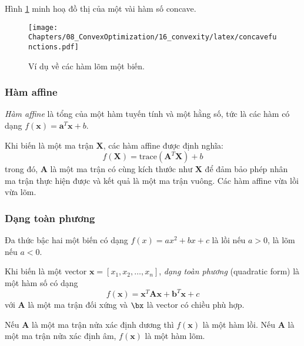 Hình \ref{fig:16_concavefunctions} minh hoạ đồ thị của một vài hàm số concave.

\begin{figure}[t]
\centering
    \texttt{[image: Chapters/08\_ConvexOptimization/16\_convexity/latex/concavefunctions.pdf]}
    \caption[]{Ví dụ về các hàm lõm một biến.}
    \label{fig:16_concavefunctions}
    \captionsetup[figure]{format=rule, justification=centering}
\end{figure}
 
\subsubsection{Hàm affine}
\textit{Hàm affine} là tổng của một hàm tuyến tính và một hằng số, tức là các hàm có dạng $f(\mathbf{x}) = \mathbf{a}^T\mathbf{x} + b $. 
 
Khi biến là một ma trận $\mathbf{X}$, các hàm affine được định nghĩa: 
\begin{equation*} 
f(\mathbf{X}) = \text{trace}(\mathbf{A}^T\mathbf{X}) + b 
\end{equation*} 
trong đó, $\mathbf{A}$ là một ma trận có cùng kích thước như $\mathbf{X}$
để đảm bảo phép nhân ma trận thực hiện được và kết quả là một ma trận vuông.
Các hàm affine vừa lồi vừa lõm. 

\subsubsection{Dạng toàn phương}
Đa thức bậc hai một biến có dạng $f(x) = a x^2 + bx + c$ là lồi nếu $a > 0$, là lõm nếu $a < 0$. 
 
Khi biến là một vector $\mathbf{x} = [x_1, x_2, \dots, x_n]$, \textit{dạng
toàn phương} ({quadratic form}) là một hàm số có dạng
\begin{equation*} 
f(\mathbf{x}) = \mathbf{x}^T\mathbf{A}\mathbf{x} + \mathbf{b}^T\mathbf{x} + c 
\end{equation*} 
với $\mathbf{A}$ là một ma trận đối xứng và $\bx$ là vector có chiều phù hợp. 

Nếu $\mathbf{A}$ là một ma trận nửa xác định dương thì $f(\mathbf{x})$ là một
hàm lồi. Nếu $\mathbf{A}$ là một ma trận nửa xác định âm, $f(\mathbf{x})$
là một hàm lõm.
 

